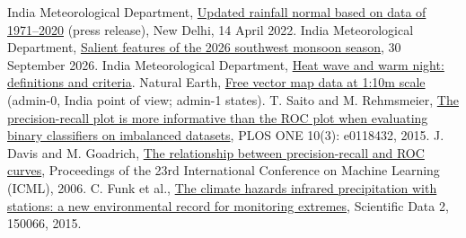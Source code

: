 \documentclass[12pt,a4paper]{report}
\newcommand{\reflink}[2]{\href{#1}{\textcolor{linkblue}{#2}}}
\begin{document}
{\begin{thebibliography}{99}
 India Meteorological Department, \reflink{https://internal.imd.gov.in/press_release/20220414_pr_1572.pdf}{Updated rainfall normal based on data of 1971--2020} (press release), New Delhi, 14 April 2022.
 India Meteorological Department, \reflink{https://mausam.imd.gov.in/Forecast/marquee_data/Salient_Features_SW_MONSOON\%20_2026_30_sep.pdf}{Salient features of the 2026 southwest monsoon season}, 30 September 2026.
 India Meteorological Department, \reflink{https://mausam.imd.gov.in/pdfs/heatcolduser/Definition.pdf}{Heat wave and warm night: definitions and criteria}.
 Natural Earth, \reflink{https://www.naturalearthdata.com}{Free vector map data at 1:10m scale} (admin-0, India point of view; admin-1 states).
 T. Saito and M. Rehmsmeier, \reflink{https://doi.org/10.1371/journal.pone.0118432}{The precision-recall plot is more informative than the ROC plot when evaluating binary classifiers on imbalanced datasets}, PLOS ONE 10(3): e0118432, 2015.
 J. Davis and M. Goadrich, \reflink{https://doi.org/10.1145/1143844.1143874}{The relationship between precision-recall and ROC curves}, Proceedings of the 23rd International Conference on Machine Learning (ICML), 2006.
 C. Funk et al., \reflink{https://doi.org/10.1038/sdata.2015.66}{The climate hazards infrared precipitation with stations: a new environmental record for monitoring extremes}, Scientific Data 2, 150066, 2015.
\end{thebibliography}}
\end{document}

